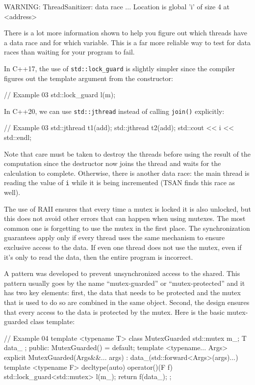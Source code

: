 \begin{code}
WARNING: ThreadSanitizer: data race
...
Location is global 'i' of size 4 at <address>
\end{code}

There is a lot more information shown to help you figure out which threads have a data race and for which variable. This is a far more reliable way to test for data races than waiting for your program to fail.

In C++17, the use of \texttt{std::lock\_guard} is slightly simpler since the compiler figures out the template argument from the constructor:

\begin{code}
// Example 03
std::lock_guard l(m);
\end{code}

In C++20, we can use \texttt{std::jthread} instead of calling \texttt{join()} explicitly:

\begin{code}
// Example 03
{
  std::jthread t1(add);
  std::jthread t2(add);
}
std::cout << i << std::endl;
\end{code}

Note that care must be taken to destroy the threads before using the result of the computation since the destructor now joins the thread and waits for the calculation to complete. Otherwise, there is another data race: the main thread is reading the value of \texttt{i} while it is being incremented (TSAN finds this race as well).

The use of RAII ensures that every time a mutex is locked it is also unlocked, but this does not avoid other errors that can happen when using mutexes. The most common one is forgetting to use the mutex in the first place. The synchronization guarantees apply only if every thread uses the same mechanism to ensure exclusive access to the data. If even one thread does not use the mutex, even if it's only to read the data, then the entire program is incorrect.

A pattern was developed to prevent unsynchronized access to the shared. This pattern usually goes by the name ``mutex-guarded'' or ``mutex-protected'' and it has two key elements: first, the data that needs to be protected and the mutex that is used to do so are combined in the same object. Second, the design ensures that every access to the data is protected by the mutex. Here is the basic mutex-guarded class template:

\begin{code}
// Example 04
template <typename T> class MutexGuarded {
  std::mutex m_;
  T data_ {};
  public:
  MutexGuarded() = default;
  template <typename... Args>
  explicit MutexGuarded(Args&&... args) :
    data_(std::forward<Args>(args)...) {}
  template <typename F> decltype(auto) operator()(F f) {
    std::lock_guard<std::mutex> l(m_);
    return f(data_);
  }
};
\end{code}

